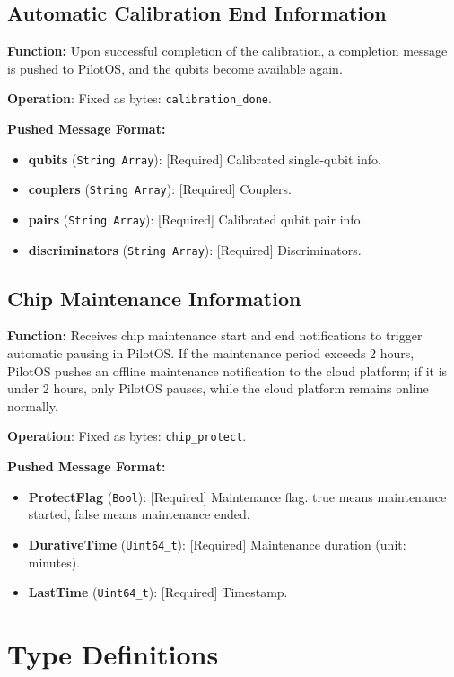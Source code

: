 \documentclass[12pt, a4paper]{article}
\begin{document}
\subsection{Automatic Calibration End Information}

\textbf{Function:} Upon successful completion of the calibration, a completion message is pushed to PilotOS, and the qubits become available again.

\textbf{Operation}: Fixed as bytes: \texttt{calibration\_done}.

\textbf{Pushed Message Format:}
\begin{itemize}
    \item \textbf{qubits} (\texttt{String Array}): [Required] Calibrated single-qubit info.
    \item \textbf{couplers} (\texttt{String Array}): [Required] Couplers.
    \item \textbf{pairs} (\texttt{String Array}): [Required] Calibrated qubit pair info.
    \item \textbf{discriminators} (\texttt{String Array}): [Required] Discriminators.
\end{itemize}

\subsection{Chip Maintenance Information}

\textbf{Function:} Receives chip maintenance start and end notifications to trigger automatic pausing in PilotOS. If the maintenance period exceeds 2 hours, PilotOS pushes an offline maintenance notification to the cloud platform; if it is under 2 hours, only PilotOS pauses, while the cloud platform remains online normally.

\textbf{Operation}: Fixed as bytes: \texttt{chip\_protect}.

\textbf{Pushed Message Format:}
\begin{itemize}
    \item \textbf{ProtectFlag} (\texttt{Bool}): [Required] Maintenance flag. true means maintenance started, false means maintenance ended.
    \item \textbf{DurativeTime} (\texttt{Uint64\_t}): [Required] Maintenance duration (unit: minutes).
    \item \textbf{LastTime} (\texttt{Uint64\_t}): [Required] Timestamp.
\end{itemize}


\section{Type Definitions}
\end{document}
